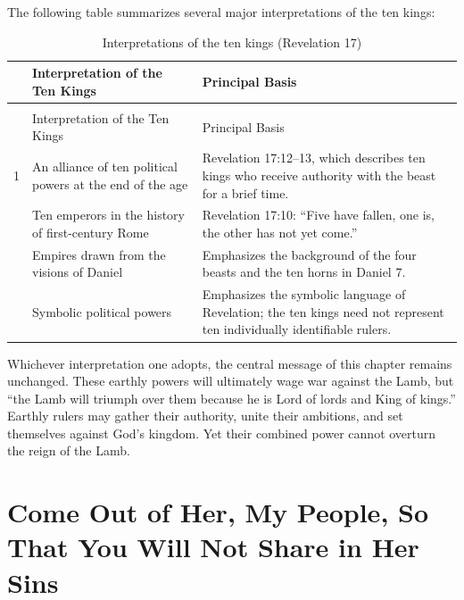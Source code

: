 The following table summarizes several major interpretations of the ten kings:

{
\renewcommand{\arraystretch}{1}
\small
\begin{longtable}{>{\centering\arraybackslash}p{0.4cm}
                  >{\raggedright\arraybackslash}p{3.3cm}
                  >{\raggedright\arraybackslash}p{5.2cm}}
\caption{Interpretations of the ten kings (Revelation 17)}
\label{tab:ten-kings} \\
\hline
 & Interpretation of the Ten Kings & Principal Basis \\
\hline
\endfirsthead

\multicolumn{3}{l}{\small\itshape Table~\thetable\ (continued)} \\
\hline
 & Interpretation of the Ten Kings & Principal Basis \\
\hline
\endhead

\hline
\endfoot

\hline
\endlastfoot

1 & An alliance of ten political powers at the end of the age &
Revelation 17:12--13, which describes ten kings who receive authority with the beast for a brief time. \\

2 & Ten emperors in the history of first-century Rome &
Revelation 17:10: ``Five have fallen, one is, the other has not yet come.'' \\

3 & Empires drawn from the visions of Daniel &
Emphasizes the background of the four beasts and the ten horns in Daniel 7. \\

4 & Symbolic political powers &
Emphasizes the symbolic language of Revelation; the ten kings need not represent ten individually identifiable rulers. \\

\end{longtable}
}

Whichever interpretation one adopts, the central message of this chapter remains unchanged. These earthly powers will ultimately wage war against the Lamb, but “the Lamb will triumph over them because he is Lord of lords and King of kings.” Earthly rulers may gather their authority, unite their ambitions, and set themselves against God's kingdom. Yet their combined power cannot overturn the reign of the Lamb.

\section{Come Out of Her, My People, So That You Will Not Share in Her Sins}

